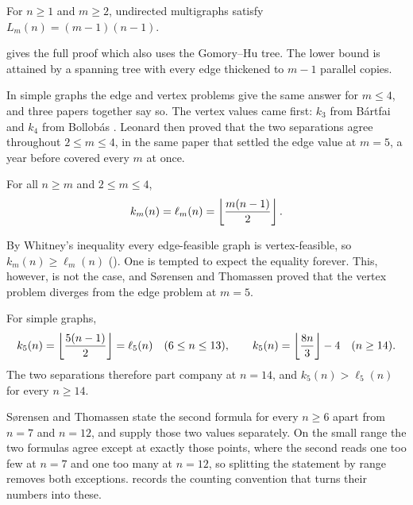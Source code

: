 \begin{theorem}\label{thm:multigraph-edge}
For $n\ge1$ and $m\ge2$, undirected multigraphs satisfy $L_m(n) = (m-1)(n-1)$.
\end{theorem}

 gives the full proof which also uses the Gomory--Hu tree.
The lower bound is attained by a spanning tree with every edge thickened to $m-1$ parallel copies.

In simple graphs the edge and vertex problems give the same answer for $m \le 4$, and three papers together say so. The vertex values came first: $k_3$ from B\'{a}rtfai \cite{Bartfai60} and $k_4$ from Bollob\'{a}s \cite{Bollobas66}. Leonard \cite{Leonard72b} then proved that the two separations agree throughout $2 \le m \le 4$, in the same paper that settled the edge value at $m = 5$, a year before  covered every $m$ at once.

\begin{theorem}\label{thm:leonard}
For all $n\ge m$ and $2\le m\le4$,
\[
    k_m(n) = \ell_m(n) = \left\lfloor \frac{m(n-1)}{2} \right\rfloor.
\]
\end{theorem}

By Whitney's inequality every edge-feasible graph is vertex-feasible, so $k_m(n) \ge \ell_m(n)$ ().
One is tempted to expect the equality forever.
This, however, is not the case, and S{\o}rensen and Thomassen proved that the vertex problem diverges from the edge problem at $m = 5$.

\begin{theorem}\label{thm:sorensen-thomassen}
For simple graphs,
\[
    k_5(n) = \left\lfloor \frac{5(n-1)}{2} \right\rfloor = \ell_5(n) \quad (6 \le n \le 13),
    \qquad
    k_5(n) = \left\lfloor \frac{8n}{3} \right\rfloor - 4 \quad (n \ge 14).
\]
The two separations therefore part company at $n = 14$, and $k_5(n) > \ell_5(n)$ for every $n \ge 14$.
\end{theorem}

S{\o}rensen and Thomassen state the second formula for every $n \ge 6$ apart from $n = 7$ and $n = 12$, and supply those two values separately. On the small range the two formulas agree except at exactly those points, where the second reads one too few at $n = 7$ and one too many at $n = 12$, so splitting the statement by range removes both exceptions.  records the counting convention that turns their numbers into these.

